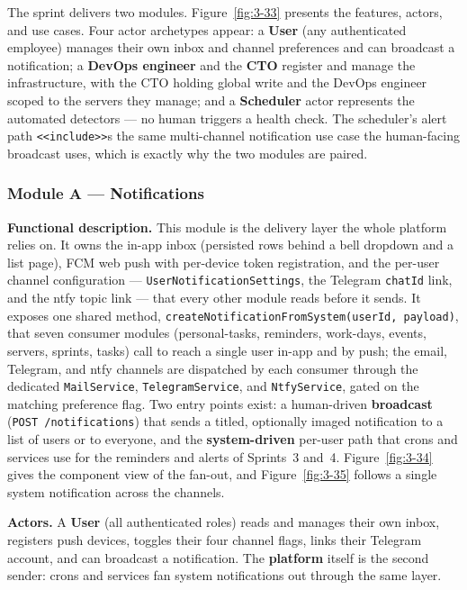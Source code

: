 The sprint delivers two modules. Figure~\ref{fig:3-33} presents the features, actors, and use
cases. Four actor archetypes appear: a \textbf{User} (any authenticated
employee) manages their own inbox and channel preferences and can broadcast a notification; a
\textbf{DevOps engineer} and the \textbf{CTO} register and manage the infrastructure, with the
CTO holding global write and the DevOps engineer scoped to the servers they manage; and a
\textbf{Scheduler} actor represents the automated detectors --- no human triggers a health
check. The scheduler's alert path \texttt{<<include>>}s the same multi-channel notification
use case the human-facing broadcast uses, which is exactly why the two modules are paired.

{\renewcommand{\figmaxheight}{0.75\textheight}%
}

\subsubsection{Module A --- Notifications}

\textbf{Functional description.} This module is the delivery layer the whole platform relies
on. It owns the in-app inbox (persisted rows behind a bell dropdown and a list page), FCM web
push with per-device token registration, and the per-user channel configuration ---
\texttt{UserNotificationSettings}, the Telegram \texttt{chatId} link, and the ntfy topic link
--- that every other module reads before it sends. It exposes one shared method,
\texttt{createNotificationFromSystem(userId, payload)}, that seven consumer modules
(personal-tasks, reminders, work-days, events, servers, sprints, tasks) call to reach a single
user in-app and by push; the email, Telegram, and ntfy channels are dispatched by each
consumer through the dedicated \texttt{MailService}, \texttt{TelegramService}, and
\texttt{NtfyService}, gated on the matching preference flag. Two entry points exist: a
human-driven \textbf{broadcast} (\texttt{POST /notifications}) that sends a titled, optionally
imaged notification to a list of users or to everyone, and the \textbf{system-driven} per-user
path that crons and services use for the reminders and alerts of Sprints~3 and~4.
Figure~\ref{fig:3-34} gives the component view of the fan-out, and Figure~\ref{fig:3-35}
follows a single system notification across the channels.

\textbf{Actors.} A \textbf{User} (all authenticated roles) reads and manages their own inbox,
registers push devices, toggles their four channel flags, links their Telegram account, and
can broadcast a notification. The \textbf{platform} itself is the second sender: crons and
services fan system notifications out through the same layer.

